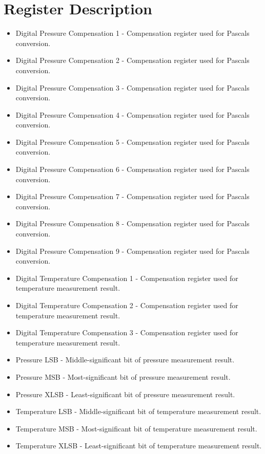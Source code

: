 \documentclass[a4paper,12pt,oneside,pdflatex,italian,final,twocolumn]{article}
\begin{document}
\section{Register Description}
\begin{itemize}
\item Digital Pressure Compensation 1 - Compensation register used for Pascals conversion.
\item Digital Pressure Compensation 2 - Compensation register used for Pascals conversion.
\item Digital Pressure Compensation 3 - Compensation register used for Pascals conversion.
\item Digital Pressure Compensation 4 - Compensation register used for Pascals conversion.
\item Digital Pressure Compensation 5 - Compensation register used for Pascals conversion.
\item Digital Pressure Compensation 6 - Compensation register used for Pascals conversion.
\item Digital Pressure Compensation 7 - Compensation register used for Pascals conversion.
\item Digital Pressure Compensation 8 - Compensation register used for Pascals conversion.
\item Digital Pressure Compensation 9 - Compensation register used for Pascals conversion.
\item Digital Temperature Compensation 1 - Compensation register used for temperature measurement result.
\item Digital Temperature Compensation 2 - Compensation register used for temperature measurement result.
\item Digital Temperature Compensation 3 - Compensation register used for temperature measurement result.
\item Pressure LSB - Middle-significant bit of pressure measurement result.
\item Pressure MSB - Most-significant bit of pressure measurement result.
\item Pressure XLSB - Least-significant bit of pressure measurement result.
\item Temperature LSB - Middle-significant bit of temperature measurement result.
\item Temperature MSB - Most-significant bit of temperature measurement result.
\item Temperature XLSB - Least-significant bit of temperature measurement result.
\end{itemize}
\end{document}
